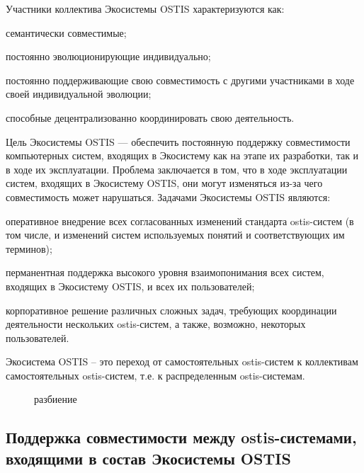 Участники коллектива Экосистемы OSTIS характеризуются как:
\begin{textitemize}
    \item семантически совместимые;
    \item постоянно эволюционирующие индивидуально;
    \item постоянно поддерживающие свою совместимость с другими участниками в ходе своей индивидуальной эволюции;
    \item способные децентрализованно координировать свою деятельность.
\end{textitemize}

Цель Экосистемы OSTIS --- обеспечить постоянную поддержку совместимости компьютерных систем, входящих в Экосистему как на этапе их разработки, так и в ходе их эксплуатации. 
Проблема заключается в том, что в ходе эксплуатации систем, входящих в Экосистему OSTIS, они могут изменяться из-за чего совместимость может нарушаться. 
Задачами Экосистемы OSTIS являются:
\begin{textitemize}
    \item оперативное внедрение всех согласованных изменений стандарта ostis-систем (в том числе, и изменений систем используемых понятий и соответствующих им терминов);
    \item перманентная поддержка высокого уровня взаимопонимания всех систем, входящих в Экосистему OSTIS, и всех их пользователей;
    \item корпоративное решение различных сложных задач, требующих координации деятельности нескольких ostis-систем, а также, возможно, некоторых пользователей.
\end{textitemize}

Экосистема OSTIS – это переход от самостоятельных ostis-систем к коллективам самостоятельных ostis-систем, т.е. к распределенным ostis-системам.

\begin{figure}[htbp]
\begin{SCn}
\begin{scnrelfromset}{разбиение}
\end{scnrelfromset}
\end{SCn}
\end{figure}


\subsection{Поддержка совместимости между ostis-системами, входящими в состав Экосистемы OSTIS}
{\label{sec_ecosystem_interoperability_support}} 

